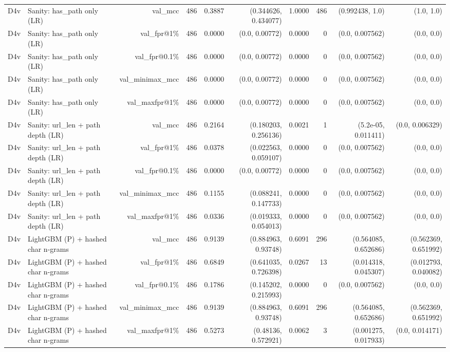 \begin{table}[t]
\begin{tabular}{llrrrrrrrr}
D4v & Sanity: has\_path only (LR) & val\_mcc & 486 & 0.3887 & (0.344626, 0.434077) & 1.0000 & 486 & (0.992438, 1.0) & (1.0, 1.0) \\
D4v & Sanity: has\_path only (LR) & val\_fpr@1\% & 486 & 0.0000 & (0.0, 0.00772) & 0.0000 & 0 & (0.0, 0.007562) & (0.0, 0.0) \\
D4v & Sanity: has\_path only (LR) & val\_fpr@0.1\% & 486 & 0.0000 & (0.0, 0.00772) & 0.0000 & 0 & (0.0, 0.007562) & (0.0, 0.0) \\
D4v & Sanity: has\_path only (LR) & val\_minimax\_mcc & 486 & 0.0000 & (0.0, 0.00772) & 0.0000 & 0 & (0.0, 0.007562) & (0.0, 0.0) \\
D4v & Sanity: has\_path only (LR) & val\_maxfpr@1\% & 486 & 0.0000 & (0.0, 0.00772) & 0.0000 & 0 & (0.0, 0.007562) & (0.0, 0.0) \\
D4v & Sanity: url\_len + path depth (LR) & val\_mcc & 486 & 0.2164 & (0.180203, 0.256136) & 0.0021 & 1 & (5.2e-05, 0.011411) & (0.0, 0.006329) \\
D4v & Sanity: url\_len + path depth (LR) & val\_fpr@1\% & 486 & 0.0378 & (0.022563, 0.059107) & 0.0000 & 0 & (0.0, 0.007562) & (0.0, 0.0) \\
D4v & Sanity: url\_len + path depth (LR) & val\_fpr@0.1\% & 486 & 0.0000 & (0.0, 0.00772) & 0.0000 & 0 & (0.0, 0.007562) & (0.0, 0.0) \\
D4v & Sanity: url\_len + path depth (LR) & val\_minimax\_mcc & 486 & 0.1155 & (0.088241, 0.147733) & 0.0000 & 0 & (0.0, 0.007562) & (0.0, 0.0) \\
D4v & Sanity: url\_len + path depth (LR) & val\_maxfpr@1\% & 486 & 0.0336 & (0.019333, 0.054013) & 0.0000 & 0 & (0.0, 0.007562) & (0.0, 0.0) \\
D4v & LightGBM (P) + hashed char n-grams & val\_mcc & 486 & 0.9139 & (0.884963, 0.93748) & 0.6091 & 296 & (0.564085, 0.652686) & (0.562369, 0.651992) \\
D4v & LightGBM (P) + hashed char n-grams & val\_fpr@1\% & 486 & 0.6849 & (0.641035, 0.726398) & 0.0267 & 13 & (0.014318, 0.045307) & (0.012793, 0.040082) \\
D4v & LightGBM (P) + hashed char n-grams & val\_fpr@0.1\% & 486 & 0.1786 & (0.145202, 0.215993) & 0.0000 & 0 & (0.0, 0.007562) & (0.0, 0.0) \\
D4v & LightGBM (P) + hashed char n-grams & val\_minimax\_mcc & 486 & 0.9139 & (0.884963, 0.93748) & 0.6091 & 296 & (0.564085, 0.652686) & (0.562369, 0.651992) \\
D4v & LightGBM (P) + hashed char n-grams & val\_maxfpr@1\% & 486 & 0.5273 & (0.48136, 0.572921) & 0.0062 & 3 & (0.001275, 0.017933) & (0.0, 0.014171) \\

\end{tabular}
\end{table}
